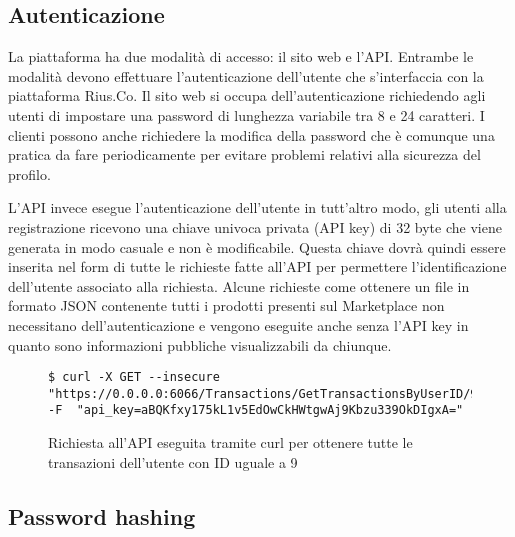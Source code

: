 \subsection{Autenticazione}
La piattaforma ha due modalità di accesso: il sito web e l'API. Entrambe le modalità devono effettuare l'autenticazione dell'utente che s'interfaccia con la piattaforma Rius.Co. Il sito web si occupa dell'autenticazione richiedendo agli utenti di impostare una password di lunghezza variabile tra 8 e 24 caratteri. I clienti possono anche richiedere la modifica della password che è comunque una pratica da fare periodicamente per evitare problemi relativi alla sicurezza del profilo. 
\medskip

L'API invece esegue l'autenticazione dell'utente in tutt'altro modo, gli utenti alla registrazione ricevono una chiave univoca privata (API key) di 32 byte che viene generata in modo casuale e non è modificabile. Questa chiave dovrà quindi essere inserita nel form di tutte le richieste fatte all'API per permettere l'identificazione dell'utente associato alla richiesta. Alcune richieste come ottenere un file in formato JSON contenente tutti i prodotti presenti sul Marketplace non necessitano dell'autenticazione e vengono eseguite anche senza l'API key in quanto sono informazioni pubbliche visualizzabili da chiunque. 
\medskip

\begin{figure}[ht]
    \begin{lstlisting}[style=dos]
$ curl -X GET --insecure "https://0.0.0.0:6066/Transactions/GetTransactionsByUserID/9" -F  "api_key=aBQKfxy175kL1v5EdOwCkHWtgwAj9Kbzu339OkDIgxA="
    \end{lstlisting}
    \caption{Richiesta all'API eseguita tramite curl per ottenere tutte le transazioni dell'utente con ID uguale a 9}
\end{figure}
\subsection{Password hashing} 
